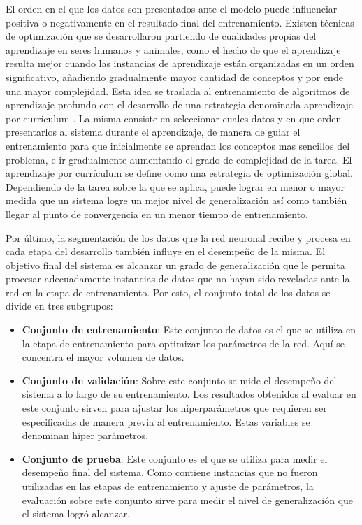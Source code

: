 El orden en el que los datos son presentados ante el modelo puede influenciar positiva o negativamente en el resultado final del entrenamiento. Existen técnicas de optimización que se desarrollaron partiendo de cualidades propias del aprendizaje en seres humanos y animales, como el hecho de que el aprendizaje resulta mejor cuando las instancias de aprendizaje están organizadas en un orden significativo, añadiendo gradualmente mayor cantidad de conceptos y por ende una mayor complejidad. Esta idea se traslada al entrenamiento de algoritmos de aprendizaje profundo con el desarrollo de una estrategia denominada aprendizaje por currículum \cite{cv}. La misma consiste en seleccionar cuales datos y en que orden presentarlos al sistema durante el aprendizaje, de manera de guiar el entrenamiento para que inicialmente se aprendan los conceptos mas sencillos del problema, e ir gradualmente aumentando el grado de complejidad de la tarea. El aprendizaje por currículum se define como una estrategia de optimización global. Dependiendo de la tarea sobre la que se aplica, puede lograr en menor o mayor medida que un sistema logre un mejor nivel de generalización así como también llegar al punto de convergencia en un menor tiempo de entrenamiento.


Por último, la segmentación de los datos que la red neuronal recibe y procesa en cada etapa del desarrollo también influye en el desempeño de la misma. El objetivo final del sistema es alcanzar un grado de generalización que le permita procesar adecuadamente instancias de datos que no hayan sido reveladas ante la red en la etapa de entrenamiento. Por esto, el conjunto total de los datos se divide en tres subgrupos: 

\begin{itemize}
\item\textbf{Conjunto de entrenamiento}: Este conjunto de datos es el que se utiliza en la etapa de entrenamiento para optimizar los parámetros de la red. Aquí se concentra el mayor volumen de datos.

\item\textbf{Conjunto de validación}: Sobre este conjunto se mide el desempeño del sistema a lo largo de su entrenamiento. Los resultados obtenidos al evaluar en este conjunto sirven para ajustar los hiperparámetros que requieren ser especificadas de manera previa al entrenamiento. Estas variables se denominan hiper parámetros.
 
\item\textbf{Conjunto de prueba}: Este conjunto es el que se utiliza para medir el desempeño final del sistema. Como contiene instancias que no fueron utilizadas en las etapas de entrenamiento y ajuste de parámetros, la evaluación sobre este conjunto sirve para medir el nivel de generalización que el sistema logró alcanzar. 

\end{itemize}


